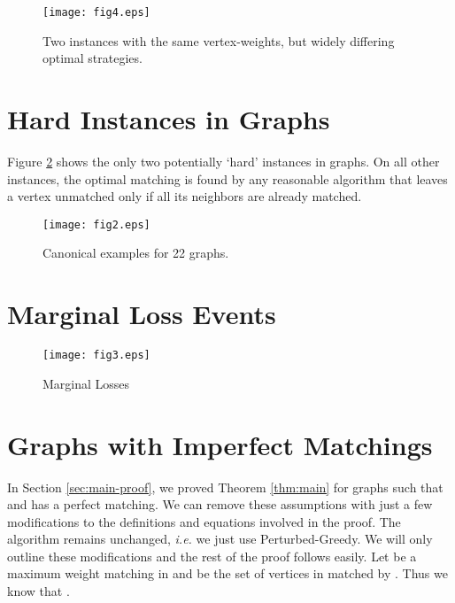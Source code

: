 \documentclass[11pt]{article}
\newcommand{\pgreedy}{{\sc Perturbed-Greedy}}
\begin{document}
\begin{figure}[h]
\begin{center}
\texttt{[image: fig4.eps]}
\end{center}
\caption{\label{fig:fig4}Two instances with the same vertex-weights, but widely differing optimal strategies.}
\end{figure}

\section{Hard Instances in  Graphs}
\label{app9}

Figure \ref{fig:twobytwo} shows the only two potentially `hard' instances in  graphs. On all other instances, the optimal matching is found by any reasonable algorithm that leaves a vertex  unmatched only if all its neighbors are already matched.

\begin{figure}[h]
\begin{center}
\texttt{[image: fig2.eps]}
\end{center}
\caption{\label{fig:twobytwo}Canonical examples for 22 graphs.}
\end{figure}


\newpage

\section{Marginal Loss Events}
\label{app8}

\begin{figure}[h]
\begin{center}
\texttt{[image: fig3.eps]}
\end{center}
\caption{\label{fig:margins}Marginal Losses}
\end{figure}




\section{Graphs with Imperfect Matchings}
\label{app1}
In Section \ref{sec:main-proof}, we proved Theorem \ref{thm:main} for graphs  such that  and  has a perfect matching. We can remove these assumptions with just a few modifications to the definitions and equations involved in the proof. The algorithm remains unchanged, \textit{i.e.} we just use \pgreedy.  We will only outline these modifications and the rest of the proof follows easily. Let  be a maximum weight matching in  and  be the set of vertices in  matched by . Thus we know that .
\end{document}
